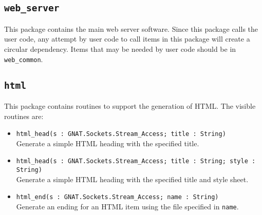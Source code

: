 \documentclass[10pt, openany, draft]{article}
\begin{document}
\subsection{\texttt{web\_server}}
This package contains the main web server software.  Since this package calls the user code, any attempt by user code to call items in this package will create a circular dependency.  Items that may be needed by user code should be in \texttt{web\_common}.

\subsection{\texttt{html}}
This package contains routines to support the generation of HTML.  The visible routines are:
\begin{itemize}
  \item \verb|html_head(s : GNAT.Sockets.Stream_Access; title : String)|\\
  Generate a simple HTML heading with the specified title.
  \item \verb|html_head(s : GNAT.Sockets.Stream_Access; title : String; style : String)|\\
  Generate a simple HTML heading with the specified title and style sheet.
  \item \verb|html_end(s : GNAT.Sockets.Stream_Access; name : String)|\\
  Generate an ending for an HTML item using the file specified in \texttt{name}.
\end{itemize}
\end{document}
